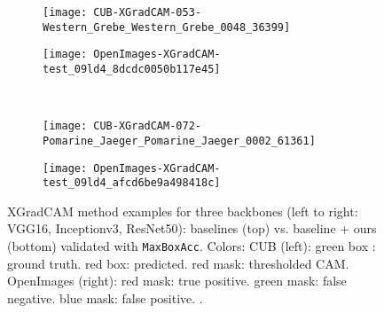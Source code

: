 \documentclass[twocolumn]{article}
\newcommand\maxboxacc{\texttt{MaxBoxAcc}\xspace}
\theoremstyle{definition}
\begin{document}
\begin{figure*}
\begin{subfigure}[b]{0.49\textwidth}
         \centering
         \texttt{[image: CUB-XGradCAM-053-Western\_Grebe\_Western\_Grebe\_0048\_36399]}
     \end{subfigure}
     \hfill
     \begin{subfigure}[b]{0.49\textwidth}
         \centering
         \texttt{[image: OpenImages-XGradCAM-test\_09ld4\_8dcdc0050b117e45]}
     \end{subfigure}
     \\
     \vspace{0.1cm}
     \begin{subfigure}[b]{0.49\textwidth}
         \centering
         \texttt{[image: CUB-XGradCAM-072-Pomarine\_Jaeger\_Pomarine\_Jaeger\_0002\_61361]}
     \end{subfigure}
     \hfill
     \begin{subfigure}[b]{0.49\textwidth}
         \centering
         \texttt{[image: OpenImages-XGradCAM-test\_09ld4\_afcd6be9a498418c]}
     \end{subfigure}
        \caption{XGradCAM method examples for three backbones (left to right: VGG16, Inceptionv3, ResNet50): baselines (top) vs. baseline + ours (bottom)  validated with \maxboxacc. Colors: CUB (left): green box : ground truth. red box: predicted. red mask: thresholded CAM. OpenImages (right): red mask: true positive. green mask: false negative. blue mask: false positive. .}
        \label{fig:xgradcam-cub-openim-example-pred}
\end{figure*}


\FloatBarrier
\clearpage
\newpage




\end{document}

